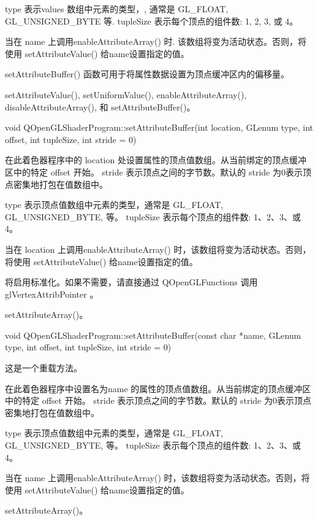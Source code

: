 type 表示values 数组中元素的类型，, 通常是 GL\_FLOAT, GL\_UNSIGNED\_BYTE 等. tupleSize 表示每个顶点的组件数: 1, 2, 3, 或 4。

当在 name 上调用enableAttributeArray() 时. 该数组将变为活动状态。否则，将使用 setAttributeValue() 给name设置指定的值。

setAttributeBuffer() 函数可用于将属性数据设置为顶点缓冲区内的偏移量。

\begin{seeAlso}
setAttributeValue(), setUniformValue(), enableAttributeArray(), disableAttributeArray(), 和 setAttributeBuffer()。
\end{seeAlso}

void QOpenGLShaderProgram::setAttributeBuffer(int location, GLenum type, int offset, int tupleSize, int stride = 0)

在此着色器程序中的 location 处设置属性的顶点值数组。从当前绑定的顶点缓冲区中的特定 offset 开始。 stride 表示顶点之间的字节数。默认的 stride 为0表示顶点密集地打包在值数组中。

type 表示顶点值数组中元素的类型，通常是 GL\_FLOAT, GL\_UNSIGNED\_BYTE, 等。 tupleSize 表示每个顶点的组件数: 1、2、3、或 4。

当在 location 上调用enableAttributeArray() 时，该数组将变为活动状态。否则，将使用 setAttributeValue() 给name设置指定的值。

\begin{notice}
将启用标准化。如果不需要，请直接通过 QOpenGLFunctions 调用glVertexAttribPointer 。
\end{notice}

\begin{seeAlso}
setAttributeArray()。
\end{seeAlso}

void QOpenGLShaderProgram::setAttributeBuffer(const char *name, GLenum type, int offset, int tupleSize, int stride = 0)

这是一个重载方法。

在此着色器程序中设置名为name 的属性的顶点值数组。从当前绑定的顶点缓冲区中的特定 offset 开始。 stride 表示顶点之间的字节数。默认的 stride 为0表示顶点密集地打包在值数组中。

type 表示顶点值数组中元素的类型，通常是 GL\_FLOAT, GL\_UNSIGNED\_BYTE, 等。 tupleSize 表示每个顶点的组件数: 1、2、3、或 4。

当在 name 上调用enableAttributeArray() 时，该数组将变为活动状态。否则，将使用 setAttributeValue() 给name设置指定的值。


\begin{seeAlso}
setAttributeArray()。
\end{seeAlso}

